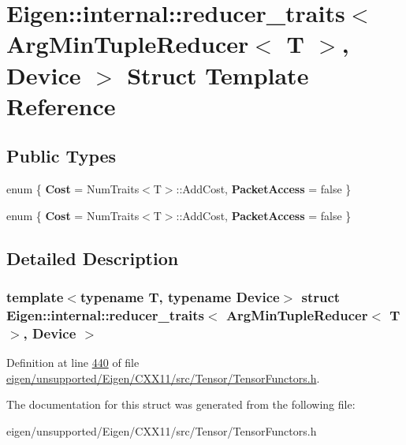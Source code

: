 \hypertarget{struct_eigen_1_1internal_1_1reducer__traits_3_01_arg_min_tuple_reducer_3_01_t_01_4_00_01_device_01_4}{}\section{Eigen\+:\+:internal\+:\+:reducer\+\_\+traits$<$ Arg\+Min\+Tuple\+Reducer$<$ T $>$, Device $>$ Struct Template Reference}
\label{struct_eigen_1_1internal_1_1reducer__traits_3_01_arg_min_tuple_reducer_3_01_t_01_4_00_01_device_01_4}
\subsection*{Public Types}
\begin{DoxyCompactItemize}
\item 
\mbox{\label{struct_eigen_1_1internal_1_1reducer__traits_3_01_arg_min_tuple_reducer_3_01_t_01_4_00_01_device_01_4_a700f9a69cc0160001bbbe8a52f9c4f29}} 
enum \{ {\bfseries Cost} = Num\+Traits$<$T$>$\+:\+:Add\+Cost, 
{\bfseries Packet\+Access} = false
 \}
\item 
\mbox{\label{struct_eigen_1_1internal_1_1reducer__traits_3_01_arg_min_tuple_reducer_3_01_t_01_4_00_01_device_01_4_aaedcbc144cb92959625d90250385d4cd}} 
enum \{ {\bfseries Cost} = Num\+Traits$<$T$>$\+:\+:Add\+Cost, 
{\bfseries Packet\+Access} = false
 \}
\end{DoxyCompactItemize}


\subsection{Detailed Description}
\subsubsection*{template$<$typename T, typename Device$>$\newline
struct Eigen\+::internal\+::reducer\+\_\+traits$<$ Arg\+Min\+Tuple\+Reducer$<$ T $>$, Device $>$}



Definition at line \hyperlink{eigen_2unsupported_2_eigen_2_c_x_x11_2src_2_tensor_2_tensor_functors_8h_source_l00440}{440} of file \hyperlink{eigen_2unsupported_2_eigen_2_c_x_x11_2src_2_tensor_2_tensor_functors_8h_source}{eigen/unsupported/\+Eigen/\+C\+X\+X11/src/\+Tensor/\+Tensor\+Functors.\+h}.



The documentation for this struct was generated from the following file\+:\begin{DoxyCompactItemize}
\item 
eigen/unsupported/\+Eigen/\+C\+X\+X11/src/\+Tensor/\+Tensor\+Functors.\+h\end{DoxyCompactItemize}
